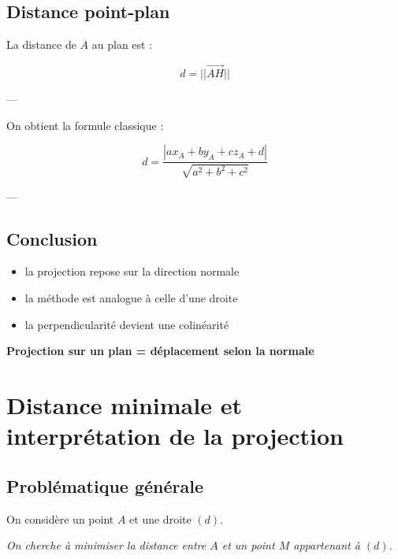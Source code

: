\documentclass[11pt,a4paper]{article}
\begin{document}
\subsection{Distance point-plan}

La distance de $A$ au plan est :

\[
d = ||\vec{AH}||
\]

---

On obtient la formule classique :

\[
\boxed{
d = \frac{|ax_A + by_A + cz_A + d|}{\sqrt{a^2 + b^2 + c^2}}
}
\]

---

\subsection{Conclusion}

\begin{itemize}
\item la projection repose sur la direction normale
\item la méthode est analogue à celle d’une droite
\item la perpendicularité devient une colinéarité
\end{itemize}

\bigskip

\begin{center}
\textbf{Projection sur un plan = déplacement selon la normale}
\end{center}

\section{Distance minimale et interprétation de la projection}

\subsection{Problématique générale}

On considère un point $A$ et une droite $(d)$.

\bigskip

\begin{center}
\textit{On cherche à minimiser la distance entre $A$ et un point $M$ appartenant à $(d)$.}
\end{center}
\end{document}

